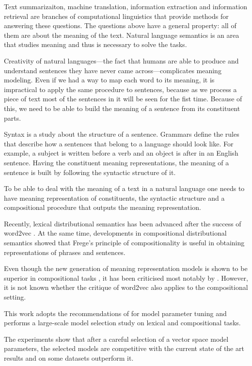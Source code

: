 Text summarizaiton, machine translation, information extraction and information retrieval are branches of computational linguistics that provide methods for answering these questions. The questions above have a general property: all of them are about the meaning of the text. Natural language semantics is an area that studies meaning and thus is necessary to solve the tasks.

Creativity of natural languages---the fact that humans are able to produce and understand sentences they have never came across---complicates meaning modeling. Even if we had a way to map each word to its meaning, it is impractical to apply the same procedure to sentences, because as we process a piece of text most of the sentences in it will be seen for the fist time. Because of this, we need to be able to build the meaning of a sentence from its constituent parts.

Syntax is a study about the structure of a sentence. Grammars define the rules that describe how a sentences that belong to a language should look like. For example, a subject is written before a verb and an object is after in an English sentence. Having the constituent meaning representations, the meaning of a sentence is built by following the syntactic structure of it.

To be able to deal with the meaning of a text in a natural language one needs to have meaning representation of constituents, the syntactic structure and a compositional procedure that outputs the meaning representation.

Recently, lexical distributional semantics \cite{BullinariaLevy2012,Bullinaria2007,Turney:2010:FMV:1861751.1861756} has been advanced after the success of word2vec \cite{mikolov2013linguistic,mikolov2013distributed,mikolov2013efficient}. At the same time, developments in compositional distributional semantics \cite{mitchell2010composition,maillard-clark-grefenstette:2014:TTNLS,Grefenstette:2011:ESC:2145432.2145580,Grefenstette:2011:ETV:2140490.2140497,kartsadrqpl2014,fried-polajnar-clark:2015:ACL-IJCNLP} showed that Frege's principle of compositionality \cite{Janssen2001} is useful in obtaining representations of phrases and sentences.

Even though the new generation of meaning representation models is shown to be superior in compositional tasks \cite{milajevs-EtAl:2014:EMNLP2014}, it has been criticised most notably by . However, it is not known whether the critique of word2vec also applies to the compositional setting.

This work adopts the recommendations of  for model parameter tuning and performs a large-scale model selection study on lexical and compositional tasks.

The experiments show that after a careful selection of a vector space model parameters, the selected models are competitive with the current state of the art results and on some datasets outperform it.

